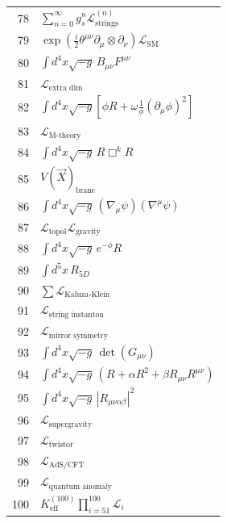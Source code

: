 \documentclass[12pt,a4paper]{article}
\begin{document}
\begin{longtable}{r p{}}
	78 & \(\displaystyle \sum_{n=0}^\infty g_s^n \mathcal{L}^{(n)}_{\text{strings}}\) \\
	79 & \(\displaystyle \exp\left(\frac{i}{2}\theta^{\mu\nu}\partial_\mu\otimes\partial_\nu\right)\mathcal{L}_{\text{SM}}\) \\
	80 & \(\displaystyle \int d^4x\sqrt{-g}\,B_{\mu\nu}F^{\mu\nu}\) \\
	81 & \(\displaystyle \mathcal{L}_{\text{extra dim}}\) \\
	82 & \(\displaystyle \int d^4x\sqrt{-g}\left[\phi R + \omega\frac{1}{\phi}(\partial_\mu\phi)^2\right]\) \\
	83 & \(\displaystyle \mathcal{L}_{\text{M-theory}}\) \\
	84 & \(\displaystyle \int d^4x\sqrt{-g}\,R\Box^k R\) \\
	85 & \(\displaystyle V(\vec{X})_{\text{brane}}\) \\
	86 & \(\displaystyle \int d^4x\sqrt{-g}\,(\nabla_\mu\psi)(\nabla^\mu\psi)\) \\
	87 & \(\displaystyle \mathcal{L}_{\text{topol}}\mathcal{L}_{\text{gravity}}\) \\
	88 & \(\displaystyle \int d^4x\sqrt{-g}\,e^{-\phi}R\) \\
	89 & \(\displaystyle \int d^5x\,R_{5D}\) \\
	90 & \(\displaystyle \sum\mathcal{L}_{\text{Kaluza-Klein}}\) \\
	91 & \(\displaystyle \mathcal{L}_{\text{string instanton}}\) \\
	92 & \(\displaystyle \mathcal{L}_{\text{mirror symmetry}}\) \\
	93 & \(\displaystyle \int d^4x\sqrt{-g}\,\det(G_{\mu\nu})\) \\
	94 & \(\displaystyle \int d^4x\sqrt{-g}\,\left(R + \alpha R^2 + \beta R_{\mu\nu}R^{\mu\nu}\right)\) \\
	95 & \(\displaystyle \int d^4x\sqrt{-g}\,|R_{\mu\nu\alpha\beta}|^2\) \\
	96 & \(\displaystyle \mathcal{L}_{\text{supergravity}}\) \\
	97 & \(\displaystyle \mathcal{L}_{\text{twistor}}\) \\
	98 & \(\displaystyle \mathcal{L}_{\text{AdS/CFT}}\) \\
	99 & \(\displaystyle \mathcal{L}_{\text{quantum anomaly}}\) \\
	100 & \(\displaystyle K^{(100)}_{\mathrm{eff}}\prod_{i=51}^{100}\mathcal{L}_i\) \\
	

\end{longtable}
\end{document}

